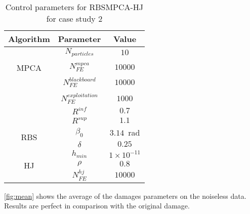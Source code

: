 \begin{table}[H]
\caption{Control parameters for RBSMPCA-HJ for case study 2}
\label{tab:param_kabe}
\footnotesize
\centering
\begin{tabular}{ccc}
\hline
Algorithm & Parameter & Value \\
\hline
\multirow{5}{*}{MPCA} & $N_{particles}$ & $10$ \\
\\[-0.7em]
& $N_{FE}^{mpca}$ & $10000$ \\
\\[-0.7em]
 & $N_{FE}^{blackboard}$ & $10000$ \\
 \\[-0.7em]
 & $N_{FE}^{exploitation}$ & $1000$ \\
 & $R^{inf}$ & $0.7$ \\
 & $R^{sup}$ & $1.1$ \\
\hline
\multirow{2}{*}{RBS} & $\beta_0$ & $3.14$~rad \\
 & $\delta$ & $0.25$ \\
\hline
\multirow{3}{*}{HJ} & $h_{min}$ & $1 \times 10^{-11}$ \\
 & $\rho $ & $0.8$ \\
 & $N_{FE}^{hj}$ & $10000$ \\
\hline
\end{tabular}
\end{table}

\autoref{fig:mean} shows the average of the damages parameters on the noiseless data. Results are perfect in comparison with the original damage.


